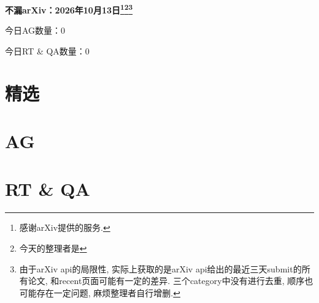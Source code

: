 \documentclass[9pt, a4paper]{article}
\theoremstyle{plain}
\theoremstyle{definition}
\theoremstyle{remark}
\newcommand{\AGnumber}{0}
\newcommand{\RTQAnumber}{0}
\newcommand{\NewestDate}{2026年10月13日}
\newcommand{\todayarXiver}{} %
\begin{document}
\begin{center}
    \Huge\textbf{不漏arXiv：\NewestDate\footnote{感谢arXiv提供的服务.}\footnote{今天的整理者是\todayarXiver}\footnote{由于arXiv api的局限性, 实际上获取的是arXiv api给出的最近三天submit的所有论文, 和recent页面可能有一定的差异. 三个category中没有进行去重, 顺序也可能存在一定问题, 麻烦整理者自行增删.}} \\
\end{center}

\setcounter{section}{-1}

\begin{center}
    今日AG数量：\AGnumber
    
    今日RT \& QA数量：\RTQAnumber
    
\end{center}


\section{精选}


\section{AG}

\section{RT \& QA}
\end{document}
